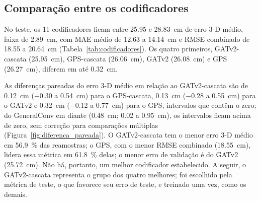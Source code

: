 \subsection{Comparação entre os codificadores}
\label{sec:codificadores}

No teste, os \num{11} codificadores ficam entre \num{25.95} e \qty{28.83}{\cm} de erro 3-D médio, faixa de \qty{2.89}{\cm}, com MAE médio de \num{12.63} a \qty{14.14}{\cm} e RMSE combinado de \num{18.55} a \qty{20.64}{\cm} (Tabela~\ref{tab:codificadores}). Os quatro primeiros, GATv2-cascata (\qty{25.95}{\cm}), GPS-cascata (\qty{26.06}{\cm}), GATv2 (\qty{26.08}{\cm}) e GPS (\qty{26.27}{\cm}), diferem em até \qty{0.32}{\cm}.

\begin{table}[H]
  \centering
  \caption{Os \num{11} codificadores da comparação final, com capacidade equiparada a \num{1843395} parâmetros, em ordem crescente de erro 3-D médio nos \num{937} eventos de teste; MAE médio, RMSE combinado e erro 3-D médio em cm. $D$: largura dos estados dos nós; $B$: lote escolhido pela sonda de memória (\num{128}, \num{256} ou \num{512} linhas de treino espelhadas, que correspondem, respectivamente, a \num{22250}, \num{11150} e \num{5600} passos de otimização em \num{50} épocas), com as taxas de aprendizado multiplicadas por $B$/\num{128}. $^{\dagger}$: não lê os atributos das arestas. Os quatro primeiros não se distinguem pela reamostragem pareada (Figura~\ref{fig:diferenca_pareada}).}
  \label{tab:codificadores}
  
\end{table}

As diferenças pareadas do erro 3-D médio em relação ao GATv2-cascata são de \qty[retain-explicit-plus]{+0.12}{\cm} (\num{-0.30} a \qty{0.54}{\cm}) para o GPS-cascata, \qty[retain-explicit-plus]{+0.13}{\cm} (\num{-0.28} a \qty{0.55}{\cm}) para o GATv2 e \qty[retain-explicit-plus]{+0.32}{\cm} (\num{-0.12} a \qty{0.77}{\cm}) para o GPS, intervalos que contêm o zero; do GeneralConv em diante (\qty[retain-explicit-plus]{+0.48}{\cm}; \num{0.02} a \qty{0.95}{\cm}), os intervalos ficam acima de zero, sem correção para comparações múltiplas (Figura~\ref{fig:diferenca_pareada}). O GATv2-cascata tem o menor erro 3-D médio em \qty{56.9}{\percent} das reamostras; o GPS, com o menor RMSE combinado (\qty{18.55}{\cm}), lidera essa métrica em \qty{61.8}{\percent} delas; o menor erro de validação é do GATv2 (\qty{25.72}{\cm}). Não há, portanto, um melhor codificador estabelecido. A seguir, o GATv2-cascata representa o grupo dos quatro melhores; foi escolhido pela métrica de teste, o que favorece seu erro de teste, e treinado uma vez, como os demais.

